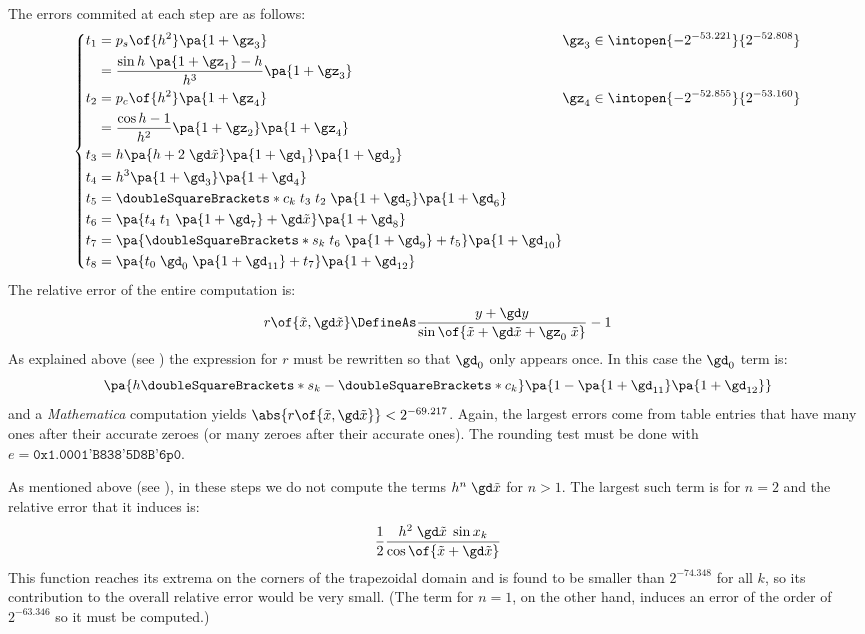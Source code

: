 \documentclass[10pt, a4paper, twoside]{basestyle}
\newcommand{\round}[1]{\doubleSquareBrackets*{#1}}
\newcommand{\red}[1]{\tilde{#1}}
\begin{document}
The errors commited at each step are as follows:
\[
\left\{
\begin{alignedat}{2}
t_1 &= p_s\of{h^2} \pa{1 + \gz_3} \qquad & \gz_3 \in \intopen{-2^{-53.221}}{2^{-52.808}} \\
&= \frac{\sin h \; \pa{1 + \gz_1} - h}{h^3} \pa{1 + \gz_3} \\
t_2 &= p_c\of{h^2} \pa{1 + \gz_4} \qquad & \gz_4 \in \intopen{-2^{-52.855}}{2^{-53.160}} \\
&= \frac{\cos h - 1}{h^2} \pa{1 + \gz_2} \pa{1 + \gz_4} \\
t_3 &= h \pa{h + 2 \; \gd \red x} \pa{1 + \gd_1} \pa{1 + \gd_2} \\
t_4 &= h^3 \pa{1 + \gd_3} \pa{1 + \gd_4} \\
t_5 &= \round{c_k} \; t_3 \; t_2 \; \pa{1 + \gd_5} \pa{1 + \gd_6} \\
t_6 &= \pa{t_4 \; t_1 \; \pa{1 + \gd_7} + \gd \red x} \pa{1 + \gd_8} \\
t_7 &= \pa{\round{s_k} \; t_6 \; \pa{1 + \gd_9} + t_5} \pa{1 + \gd_{10}} \\
t_8 &= \pa{t_0 \; \gd_0 \; \pa{1 + \gd_{11}} + t_7} \pa{1 + \gd_{12}}
\end{alignedat}
\right.
\]
The relative error of the entire computation is:
\[
r\of{\red x, \gd \red x} \DefineAs \frac{y + \gd y}{\sin\of{\red x + \gd \red x + \gz_0 \; \red x}} - 1
\]
As explained above (see ) the expression for $r$ must be rewritten so that $\gd_0$ only appears once.  In this case the $\gd_0$ term is:
\[
\pa{h \round{s_k} - \round{c_k}} \pa{1 - \pa{1 + \gd_{11}} \pa{1 + \gd_{12}}}
\]
and a \textit{Mathematica} computation yields $\abs{r\of{\red x, \gd \red x}} < 2^{-69.217}$.  Again, the largest errors come from table entries that have many ones after their accurate zeroes (or many zeroes after their accurate ones).  The rounding test must be done with $e = \texttt{0x1.0001'B838'5D8B'6p0}$.

As mentioned above (see ), in these steps we do not compute the terms $h^n \; \gd \red x$ for $n > 1$.  The largest such term is for $n = 2$ and the relative error that it induces is:
\[
\frac{1}{2}\frac{h^2 \; \gd \red x \; \sin x_k}{\cos\of{\red x + \gd \red x}}
\]
This function reaches its extrema on the corners of the trapezoidal domain and is found to be smaller than $2^{-74.348}$ for all $k$, so its contribution to the overall relative error would be very small.  (The term for $n = 1$, on the other hand, induces an error of the order of $2^{-63.346}$ so it must be computed.)
\end{document}
